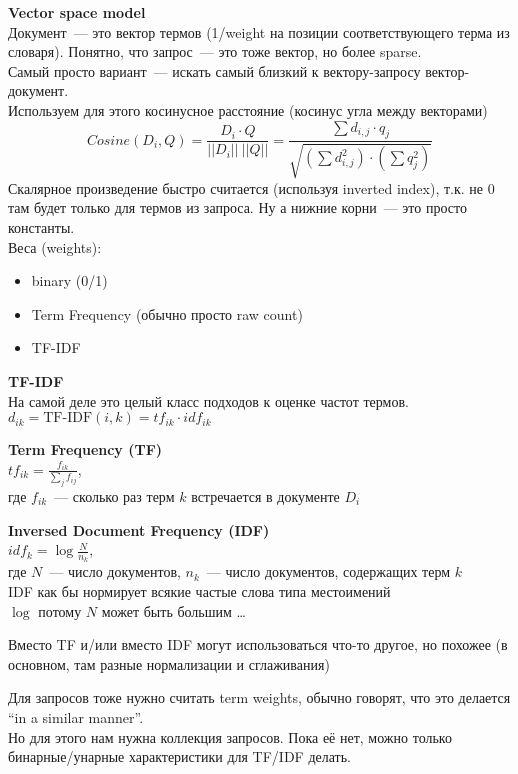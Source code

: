 \documentclass[12pt]{article}
\begin{document}
    \smallskip\smallskip
    {\bf Vector space model}\\
    Документ~--- это вектор термов (1/weight на позиции соответствующего терма из словаря). Понятно, что запрос~--- это тоже вектор, но более sparse.\\
    Самый просто вариант~--- искать самый близкий к вектору-запросу вектор-документ.\\
    Используем для этого косинусное расстояние (косинус угла между векторами)
    $$Cosine(D_i, Q) = \frac{D_i \cdot Q}{||D_i||~||Q||} = \frac{\sum d_{i, j} \cdot q_j}{\sqrt{(\sum d_{i, j}^2) \cdot (\sum q_j^2)}}$$
    Скалярное произведение быстро считается (используя inverted index), т.к. не 0 там будет только для термов из запроса. Ну а нижние корни~--- это просто константы.\\
    Веса (weights):
      \begin{itemize}
        \item binary (0/1)
        \item Term Frequency (обычно просто raw count)
        \item TF-IDF
      \end{itemize}

    \smallskip\smallskip
    {\bf TF-IDF}\\
    На самой деле это целый класс подходов к оценке частот термов.\\
    $d_{ik} = \text{TF-IDF}(i, k) = tf_{ik} \cdot idf_{ik}$

    \smallskip\smallskip
    {\bf Term Frequency (TF)}\\
    $tf_{ik} = \frac{f_{ik}}{\sum_j f_{ij}}$,\\ где $f_{ik}$~--- сколько раз терм $k$ встречается в документе $D_i$

    \smallskip\smallskip
    {\bf Inversed Document Frequency (IDF)}\\
    $idf_k = \log \frac{N}{n_k}$,\\ где $N$~--- число документов, $n_k$~--- число документов, содержащих терм $k$\\
    IDF как бы нормирует всякие частые слова типа местоимений\\
    $\log$ потому $N$ может быть большим \dots

    Вместо TF и/или вместо IDF могут использоваться что-то другое, но похожее (в основном, там разные нормализации и сглаживания) 

    Для запросов тоже нужно считать term weights, обычно говорят, что это делается ``in a similar manner''.\\
    Но для этого нам нужна коллекция запросов. Пока её нет, можно только бинарные/унарные характеристики для TF/IDF делать.
\end{document}
